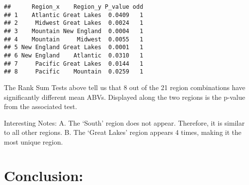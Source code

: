 \documentclass[
]{article}
\newenvironment{Shaded}{\begin{snugshade}}{\end{snugshade}}
\newcommand{\CommentTok}[1]{\textcolor[rgb]{0.56,0.35,0.01}{\textit{#1}}}
\newcommand{\DecValTok}[1]{\textcolor[rgb]{0.00,0.00,0.81}{#1}}
\newcommand{\FunctionTok}[1]{\textcolor[rgb]{0.00,0.00,0.00}{#1}}
\newcommand{\NormalTok}[1]{#1}
\newcommand{\OtherTok}[1]{\textcolor[rgb]{0.56,0.35,0.01}{#1}}
\newcommand{\SpecialCharTok}[1]{\textcolor[rgb]{0.00,0.00,0.00}{#1}}
\begin{document}
\begin{Shaded}
\end{Shaded}

\begin{verbatim}
##      Region_x    Region_y P_value odd
## 1    Atlantic Great Lakes  0.0409   1
## 2     Midwest Great Lakes  0.0024   1
## 3    Mountain New England  0.0004   1
## 4    Mountain     Midwest  0.0055   1
## 5 New England Great Lakes  0.0001   1
## 6 New England    Atlantic  0.0310   1
## 7     Pacific Great Lakes  0.0144   1
## 8     Pacific    Mountain  0.0259   1
\end{verbatim}

The Rank Sum Tests above tell us that 8 out of the 21 region
combinations have significantly different mean ABVs. Displayed along the
two regions is the p-value from the associated test.

Interesting Notes: A. The `South' region does not appear. Therefore, it
is similar to all other regions. B. The `Great Lakes' region appears 4
times, making it the most unique region.

\hypertarget{conclusion}{%
\section{Conclusion:}\label{conclusion}}
\end{document}
